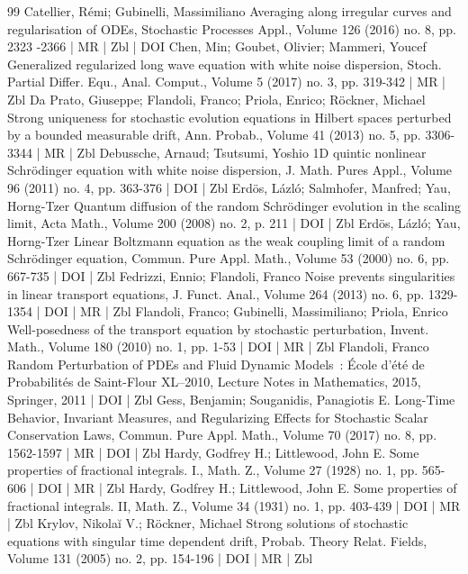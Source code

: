 \documentclass[10pt]{amsart}
\theoremstyle{definition}\newtheorem{defi}[theo]{Definition}\newtheorem{rema}[theo]{Remark}\newtheorem{exam}[theo]{Example}\newtheorem{exem}[theo]{Example}\newtheorem{nota}[theo]{Notation}
\begin{document}
\begin{thebibliography}{99}
Catellier, Rémi; Gubinelli, Massimiliano Averaging along irregular curves and regularisation of ODEs, Stochastic Processes Appl., Volume 126 (2016) no. 8, pp. 2323 -2366 | MR | Zbl | DOI
Chen, Min; Goubet, Olivier; Mammeri, Youcef Generalized regularized long wave equation with white noise dispersion, Stoch. Partial Differ. Equ., Anal. Comput., Volume 5 (2017) no. 3, pp. 319-342 | MR | Zbl
Da Prato, Giuseppe; Flandoli, Franco; Priola, Enrico; Röckner, Michael Strong uniqueness for stochastic evolution equations in Hilbert spaces perturbed by a bounded measurable drift, Ann. Probab., Volume 41 (2013) no. 5, pp. 3306-3344 | MR | Zbl
Debussche, Arnaud; Tsutsumi, Yoshio 1D quintic nonlinear Schrödinger equation with white noise dispersion, J. Math. Pures Appl., Volume 96 (2011) no. 4, pp. 363-376 | DOI | Zbl
Erdös, Lázló; Salmhofer, Manfred; Yau, Horng-Tzer Quantum diffusion of the random Schrödinger evolution in the scaling limit, Acta Math., Volume 200 (2008) no. 2, p. 211 | DOI | Zbl
Erdös, Lázló; Yau, Horng-Tzer Linear Boltzmann equation as the weak coupling limit of a random Schrödinger equation, Commun. Pure Appl. Math., Volume 53 (2000) no. 6, pp. 667-735 | DOI | Zbl
Fedrizzi, Ennio; Flandoli, Franco Noise prevents singularities in linear transport equations, J. Funct. Anal., Volume 264 (2013) no. 6, pp. 1329-1354 | DOI | MR | Zbl
Flandoli, Franco; Gubinelli, Massimiliano; Priola, Enrico Well-posedness of the transport equation by stochastic perturbation, Invent. Math., Volume 180 (2010) no. 1, pp. 1-53 | DOI | MR | Zbl
Flandoli, Franco Random Perturbation of PDEs and Fluid Dynamic Models : École d’été de Probabilités de Saint-Flour XL–2010, Lecture Notes in Mathematics, 2015, Springer, 2011 | DOI | Zbl
Gess, Benjamin; Souganidis, Panagiotis E. Long-Time Behavior, Invariant Measures, and Regularizing Effects for Stochastic Scalar Conservation Laws, Commun. Pure Appl. Math., Volume 70 (2017) no. 8, pp. 1562-1597 | MR | DOI | Zbl
Hardy, Godfrey H.; Littlewood, John E. Some properties of fractional integrals. I., Math. Z., Volume 27 (1928) no. 1, pp. 565-606 | DOI | MR | Zbl
Hardy, Godfrey H.; Littlewood, John E. Some properties of fractional integrals. II, Math. Z., Volume 34 (1931) no. 1, pp. 403-439 | DOI | MR | Zbl
Krylov, Nikolaĭ V.; Röckner, Michael Strong solutions of stochastic equations with singular time dependent drift, Probab. Theory Relat. Fields, Volume 131 (2005) no. 2, pp. 154-196 | DOI | MR | Zbl

\end{thebibliography}
\end{document}
